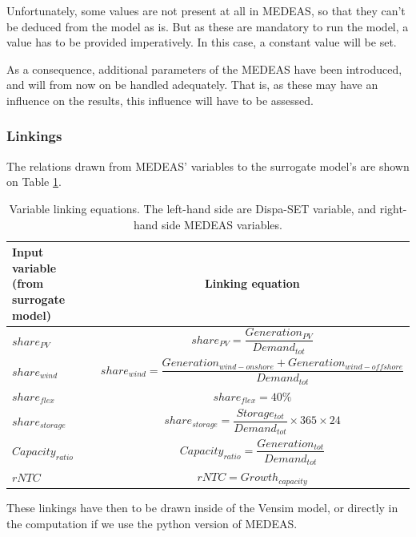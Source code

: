 Unfortunately, some values are not present at all in MEDEAS, so that they can't be deduced from the model as is. But as these are mandatory to run the model, a value has to be provided imperatively. In this case, a constant value will be set.

As a consequence, additional parameters of the MEDEAS have been introduced, and will from now on be handled adequately. That is, as these may have an influence on the results, this influence will have to be assessed.

\subsubsection{Linkings}

The relations drawn from MEDEAS' variables to the surrogate model's are shown on Table \ref{tab:linking-equations}.

\begin{table}[h]
    \centering
    \begin{tabular}{|m{3.6cm}|c|}
    \hline 
    Input variable (from surrogate model) & Linking equation \\ \hline
    $share_{PV}$ & $share_{PV}=\dfrac{Generation_{PV}}{Demand_{tot}}$ \\ \hline 
    $share_{wind}$ & $share_{wind}=\dfrac{Generation_{wind-onshore} + Generation_{wind-offshore}}{Demand_{tot}}$ \\ \hline 
    $share_{flex}$ & $share_{flex}=40\%$ \\ \hline 
    $share_{storage}$ & $share_{storage}=\dfrac{Storage_{tot}}{Demand_{tot}}\times 365\times 24$ \\ \hline 
    $Capacity_{ratio}$ & $Capacity_{ratio}=\dfrac{Generation_{tot}}{Demand_{tot}}$ \\ \hline 
    $rNTC$ & $rNTC= Growth_{capacity}$ \\ \hline 
    \end{tabular}
    \caption{Variable linking equations. The left-hand side are Dispa-SET variable, and right-hand side MEDEAS variables.}
    \label{tab:linking-equations}
\end{table}

These linkings have then to be drawn inside of the Vensim model, or directly in the computation if we use the python version of MEDEAS.